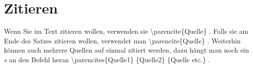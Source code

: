 \chapter{Zitieren}
Wenn Sie im Text zitieren wollen, verwenden sie \textbackslash parencite\{Quelle\} \textcite{Hu60}. Falls sie am Ende des Satzes zitieren wollen, verwendet man \textbackslash parencite\{Quelle\} \parencite[600]{OsRu94}. Weiterhin können auch mehrere Quellen auf einmal zitiert werden, dazu hängt man noch ein \emph{s} an den Befehl heran \textbackslash parencites\{Quelle1\} \{Quelle2\} \{Quelle etc.\} \parencites{NiRo00}{McMc87}{Pa01}.